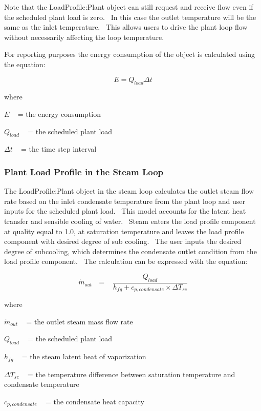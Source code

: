 Note that the LoadProfile:Plant object can still request and receive flow even if the scheduled plant load is zero.~ In this case the outlet temperature will be the same as the inlet temperature.~ This allows users to drive the plant loop flow without necessarily affecting the loop temperature.

For reporting purposes the energy consumption of the object is calculated using the equation:

\begin{equation}
E = {Q_{load}}\Delta t
\end{equation}

where

\(E\) ~ = the energy consumption

\({Q_{load}}\) ~ = the scheduled plant load

\(\Delta t\) ~ = the time step interval


\subsubsection{Plant Load Profile in the Steam Loop}\label{plant-load-profile-in-the-steam-loop}

The LoadProfile:Plant object in the steam loop calculates the outlet steam flow rate based on the inlet condensate temperature from the plant loop and user inputs for the scheduled plant load.~ This model accounts for the latent heat transfer and sensible cooling of water.~ Steam enters the load profile component at quality equal to 1.0, at saturation temperature and leaves the load profile component with desired degree of sub cooling.~ The user inputs the desired degree of subcooling, which determines the condensate outlet condition from the load profile component.~ The calculation can be expressed with the equation:

\begin{equation}
{\dot m_{out}}\,\,\,\, = \,\,\,\,\,\frac{{{Q_{load}}}}{{{h_{fg}} + {c_{p,condensate}} \times \Delta {T_{sc}}}}
\end{equation}

where

\({\dot m_{out}}\) ~ = the outlet steam mass flow rate

\({Q_{load}}\) ~ = the scheduled plant load

\({h_{fg}}\) ~ = the steam latent heat of vaporization

\({ \Delta {T_{sc}}}\) ~ = the temperature difference between saturation temperature and condensate temperature

\({c_{p,condensate}}\) ~ = the condensate heat capacity